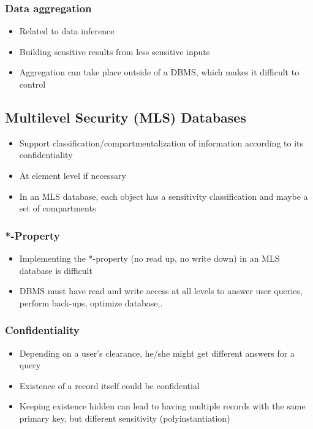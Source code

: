 \documentclass[twoside]{article}
\begin{document}
\subsubsection{Data aggregation}
\begin{itemize}
\item Related to data inference
\item Building sensitive results from less sensitive inputs
\item Aggregation can take place outside of a DBMS, which makes it difficult to control
\end{itemize}

\subsection{Multilevel Security (MLS) Databases}
\begin{itemize}
\item Support classification/compartmentalization of information according to its confidentiality
\item At element level if necessary
\item In an MLS database, each object has a sensitivity classification and maybe a set of compartments
\end{itemize}

\subsubsection{*-Property}
\begin{itemize}
\item Implementing the *-property (no read up, no write down) in an MLS database is difficult
\item DBMS must have read and write access at all levels to answer user queries, perform back-ups, optimize database,. 
\end{itemize}

\subsubsection{Confidentiality}
\begin{itemize}
\item Depending on a user’s clearance, he/she might get different answers for a query
\item Existence of a record itself could be confidential
\item Keeping existence hidden can lead to having multiple records with the same primary key, but different sensitivity (polyinstantiation)
\end{itemize}
\end{document}
